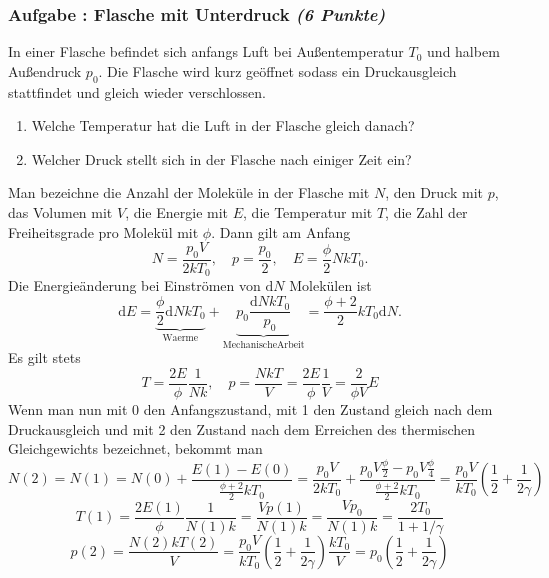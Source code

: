 \documentclass[12pt,a4paper]{article}
\newcommand{\dif}{\mathrm{d}}
\newenvironment{abcenum}{\renewcommand{\labelenumi}{(\alph{enumi})} \begin{enumerate}}{\end{enumerate}\renewcommand{\labelenumi}{\theenumi .}}
\newcounter{numlabel}
\newenvironment{problem}[2]{\stepcounter{numlabel} \vspace{1ex} \subsubsection*{Aufgabe \the\value{numlabel}: #1 \emph{(#2 Punkte)}} \renewcommand{\Currentlabel}{Aufgabe \the\value{numlabel}: #1}}{

}
\begin{document}
\begin{problem}{Flasche mit Unterdruck}{6}
In einer Flasche befindet sich anfangs Luft bei Außentemperatur $T_0$ und halbem Außendruck $p_0$. Die Flasche wird kurz geöffnet sodass ein Druckausgleich stattfindet und gleich wieder verschlossen.
\begin{abcenum}
\item Welche Temperatur hat die Luft in der Flasche gleich danach?
\item Welcher Druck stellt sich in der Flasche nach einiger Zeit ein?
\end{abcenum}
\begin{solution}
Man bezeichne die Anzahl der Moleküle in der Flasche mit $N$, den Druck mit $p$, das Volumen mit $V$, die Energie mit $E$, die Temperatur mit $T$, die Zahl der Freiheitsgrade pro Molekül mit $\phi$. Dann gilt am Anfang
\[
N = \frac{p_0 V}{2 k T_0}, \quad p = \frac{p_0}{2}, \quad E = \frac{\phi}{2} N k T_0.
\]
Die Energieänderung bei Einströmen von $\dif N$ Molekülen ist
\[
\dif E = \underbrace{\frac\phi2 \dif N k T_0}_\mathrm{Waerme} + \underbrace{p_0 \frac{\dif N k T_0}{p_0}}_\mathrm{Mechanische Arbeit} = \frac{\phi+2}{2} k T_0 \dif N.
\]
Es gilt stets
\[
T=\frac{2 E}{\phi}\frac{1}{N k}, \quad  p = \frac{NkT}{V} = \frac{2 E}{\phi} \frac1V = \frac{2}{\phi V}  E
\]
Wenn man nun mit 0 den Anfangszustand, mit 1 den Zustand gleich nach dem Druckausgleich und mit 2 den Zustand nach dem Erreichen des thermischen Gleichgewichts bezeichnet, bekommt man
\[
N(2) = N(1) = N(0) + \frac{E(1) - E(0)}{\frac{\phi+2}{2} k T_0} = \frac{p_0 V}{2 k T_0} + \frac{p_0 V \frac{\phi}{2} - p_0 V \frac{\phi}{4}}{\frac{\phi+2}{2} k T_0} = \frac{p_0 V}{k T_0} \left( \frac12 + \frac1{2\gamma} \right)
\]
\[
T(1) = \frac{2 E(1)}{\phi}\frac{1}{N(1) k} = \frac{V p(1)}{N(1) k} = \frac{V p_0}{N(1) k} = \frac{2 T_0}{1+1/\gamma}
\]
\[
p(2) = \frac{N(2) k T(2)}{V} = \frac{p_0 V}{k T_0} \left( \frac12 + \frac1{2\gamma} \right) \frac{k T_0}{V} = p_0 \left( \frac12 + \frac1{2\gamma} \right)
\]
\end{solution}
\end{problem}
\end{document}
